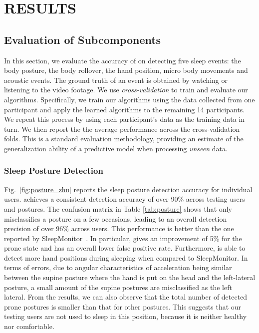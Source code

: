 \section{RESULTS}\label{sec:4experiment}

\subsection{Evaluation of Subcomponents}
In this section, we evaluate the accuracy of \systemname on detecting five sleep events: the body posture, the body rollover, the hand
position, micro body movements and acoustic events. The ground truth of an event is obtained by watching or listening to the video footage.
We use \emph{cross-validation} to train and evaluate our algorithms. Specifically, we train our algorithms using the data collected from
one participant and apply the learned algorithms to the remaining 14 participants. We repeat this process by using each participant's data
as the training data in turn. We then report the the average performance across the cross-validation folds. This is a standard evaluation
methodology, providing an estimate of the generalization ability of a predictive model when processing \emph{unseen} data.

\subsubsection{Sleep Posture Detection}
\label{subsub:bodyposture} Fig.~\ref{fig:posture_zhu} reports the sleep posture detection accuracy for individual users. \systemname
achieves a consistent detection accuracy of over 90\% across testing users and postures. The confusion matrix in Table \ref{tab:posture}
shows that \systemname only misclassifies a posture on a few occasions, leading to an overall detection precision of over 96\% across
users. This performance is better than the one reported by SleepMonitor~\cite{sleepmonitor}. In particular, {\systemname} gives an
improvement of 5\% for the prone state and has an overall lower false positive rate. Furthermore, {\systemname} is able to detect more hand
positions during sleeping when compared to SleepMonitor. In terms of errors, due to angular characteristics of acceleration being similar
between the supine posture where the hand is put on the head and the left-lateral posture, a small amount of the supine postures are
misclassified as the left lateral. From the results, we can also observe that the total number of detected prone postures is smaller than
that for other postures. This suggests that our testing users are not used to sleep in this position, because it is neither healthy nor
comfortable.






